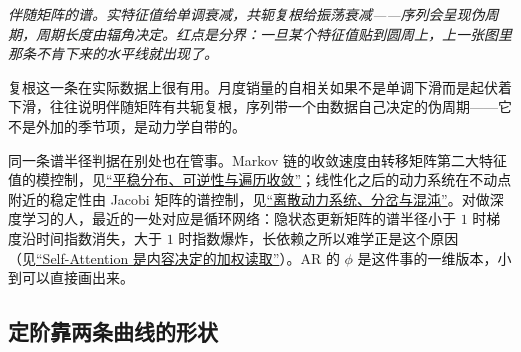 \begin{center}

\emph{伴随矩阵的谱。实特征值给单调衰减，共轭复根给振荡衰减——序列会呈现伪周期，周期长度由辐角决定。红点是分界：一旦某个特征值贴到圆周上，上一张图里那条不肯下来的水平线就出现了。}
\end{center}

复根这一条在实际数据上很有用。月度销量的自相关如果不是单调下滑而是起伏着下滑，往往说明伴随矩阵有共轭复根，序列带一个由数据自己决定的伪周期——它不是外加的季节项，是动力学自带的。

同一条谱半径判据在别处也在管事。Markov 链的收敛速度由转移矩阵第二大特征值的模控制，见\hyperref[sec:06-Random-Processes/03-Markov-Chains/04]{``平稳分布、可逆性与遍历收敛''}；线性化之后的动力系统在不动点附近的稳定性由 Jacobi 矩阵的谱控制，见\hyperref[sec:15-Differential-Equations-and-Dynamical-Systems/02-Stability-and-Dynamical-Systems/03]{``离散动力系统、分岔与混沌''}。对做深度学习的人，最近的一处对应是循环网络：隐状态更新矩阵的谱半径小于 \(1\) 时梯度沿时间指数消失，大于 \(1\) 时指数爆炸，长依赖之所以难学正是这个原因（见\hyperref[sec:14-Deep-Learning/05-Attention-and-Sequence-Models/01]{``Self-Attention 是内容决定的加权读取''}）。AR 的 \(\phi\) 是这件事的一维版本，小到可以直接画出来。

\subsection{定阶靠两条曲线的形状}

